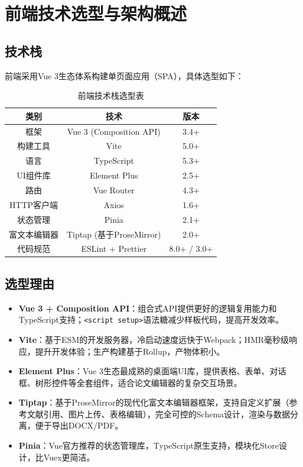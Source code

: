 \documentclass{../../softeng}
\begin{document}
\section{前端技术选型与架构概述}

\subsection{技术栈}

前端采用Vue 3生态体系构建单页面应用（SPA），具体选型如下：

\begin{table}[htbp]
    \centering
    \caption{前端技术栈选型表}
    \begin{tabular}{|c|c|c|}
        \hline
        \textbf{类别} & \textbf{技术} & \textbf{版本} \\
        \hline
        框架 & Vue 3 (Composition API) & 3.4+ \\
        \hline
        构建工具 & Vite & 5.0+ \\
        \hline
        语言 & TypeScript & 5.3+ \\
        \hline
        UI组件库 & Element Plus & 2.5+ \\
        \hline
        路由 & Vue Router & 4.3+ \\
        \hline
        HTTP客户端 & Axios & 1.6+ \\
        \hline
        状态管理 & Pinia & 2.1+ \\
        \hline
        富文本编辑器 & Tiptap (基于ProseMirror) & 2.0+ \\
        \hline
        代码规范 & ESLint + Prettier & 8.0+ / 3.0+ \\
        \hline
    \end{tabular}
\end{table}

\subsection{选型理由}

\begin{itemize}
    \item \textbf{Vue 3 + Composition API}：组合式API提供更好的逻辑复用能力和TypeScript支持；\texttt{<script setup>}语法糖减少样板代码，提高开发效率。
    \item \textbf{Vite}：基于ESM的开发服务器，冷启动速度远快于Webpack；HMR毫秒级响应，提升开发体验；生产构建基于Rollup，产物体积小。
    \item \textbf{Element Plus}：Vue 3生态最成熟的桌面端UI库，提供表格、表单、对话框、树形控件等全套组件，适合论文编辑器的复杂交互场景。
    \item \textbf{Tiptap}：基于ProseMirror的现代化富文本编辑器框架，支持自定义扩展（参考文献引用、图片上传、表格编辑），完全可控的Schema设计，渲染与数据分离，便于导出DOCX/PDF。
    \item \textbf{Pinia}：Vue官方推荐的状态管理库，TypeScript原生支持，模块化Store设计，比Vuex更简洁。
\end{itemize}
\end{document}
